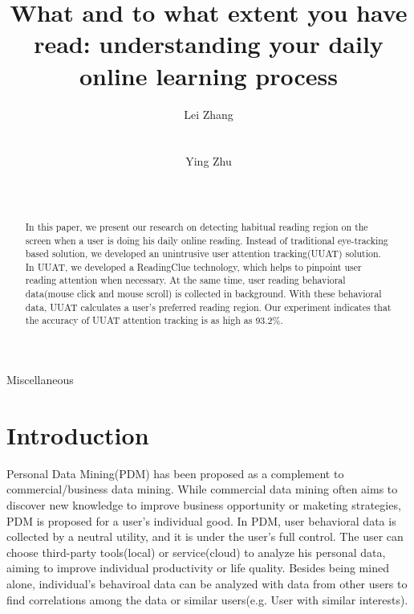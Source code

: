 \documentclass{sigchi}
\begin{document}
\title{What and to what extent you have read: understanding your daily online learning process}

\author{
  \alignauthor Lei Zhang\\
    \\
    \\
  \alignauthor Ying Zhu\\
    \\
    \\
}

\maketitle

\begin{abstract}

In this paper, we present our research on detecting habitual reading region 
on the screen when a user is doing his daily online reading. Instead of traditional eye-tracking based solution,
we developed an unintrusive user attention tracking(UUAT) solution. In UUAT, we developed a ReadingClue 
technology,  which helps to pinpoint user reading attention when necessary. At the same time, user reading behavioral data(mouse click and mouse scroll) is
collected in background. With these behavioral data, UUAT calculates a user's preferred reading region. Our experiment
indicates that the accuracy of UUAT attention tracking is as high as 93.2\%.





\end{abstract}


{Miscellaneous}

\section{Introduction}

Personal Data Mining\cite{ozzie2011personal}(PDM) has been proposed as a complement to commercial/business data mining. While commercial data mining\cite{berry1997data} often aims to discover new knowledge to improve business opportunity or maketing strategies,  PDM is proposed for a user’s individual good. In PDM, user behavioral data is collected by a neutral utility, and it is under the user's full control. The user can choose third-party tools(local) or service(cloud) to analyze his personal data, aiming to improve individual productivity or life quality. Besides being mined alone, individual's behaviroal data can be analyzed with data from other users to find correlations among the data or similar users(e.g. User with similar interests).
\end{document}

